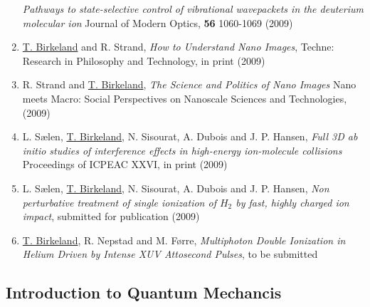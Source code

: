 \documentclass{beamer}
\begin{document}
\begin{frame}
\begin{enumerate}
{			\textit{Pathways to state-selective control of vibrational wavepackets in the deuterium molecular ion} Journal of Modern Optics, \textbf{56} 1060-1069 (2009) 
			}
		\item
			{\color<2->{gray}
			\underline{T. Birkeland} and R. Strand, 
			\textit{How to Understand Nano Images},
			Techne: Research in Philosophy and Technology, in print (2009)
			}
		\item
			{\color<2->{gray}
			R. Strand and \underline{T. Birkeland}, 
			\textit{The Science and Politics of Nano Images} Nano meets Macro: Social Perspectives on Nanoscale Sciences and Technologies, (2009)
			}
		\item
			{\color<2->{gray}
			L. Sælen, \underline{T. Birkeland}, N. Sisourat, A. Dubois and J. P. Hansen, 
			\textit{Full 3D ab initio studies of interference effects in high-energy ion-molecule collisions} Proceedings of ICPEAC XXVI, in print (2009)
			}
		\item
			{\color<2->{uibgreen}
			L. Sælen, \underline{T. Birkeland}, N. Sisourat, A. Dubois and J. P. Hansen, 
			\textit{Non perturbative treatment of single ionization of $H_2$ by fast, highly charged ion impact},
			submitted for publication (2009)
			}
		\item
			{\color<3->{uibred}
			\underline{T. Birkeland}, R. Nepstad and M. Førre,  
			\textit{Multiphoton Double Ionization in Helium Driven by Intense XUV Attosecond Pulses},
			to be submitted 
			}
	\end{enumerate}
\end{frame}




\subsection{Introduction to Quantum Mechancis}
\end{document}
